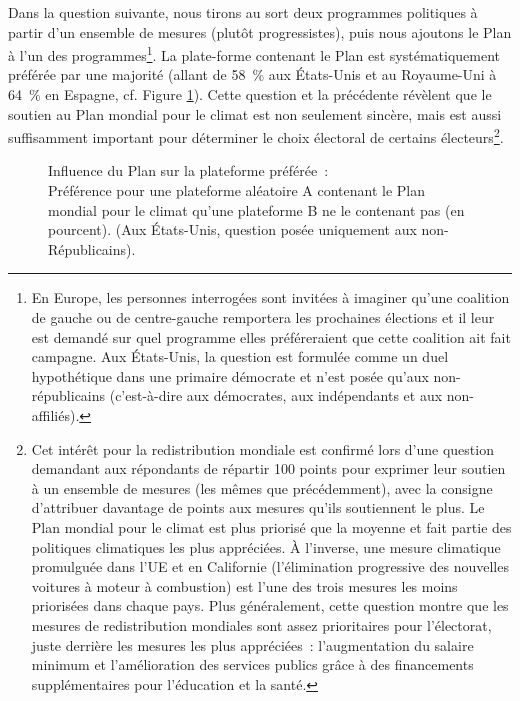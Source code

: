 \documentclass[a5paper,french]{memoir}
\begin{document}
Dans la question suivante, nous tirons au sort deux programmes politiques à partir d'un ensemble de mesures (plutôt progressistes), puis nous ajoutons le Plan à l'un des programmes\footnote{En Europe, les personnes interrogées sont invitées à imaginer qu'une coalition de gauche ou de centre-gauche remportera les prochaines élections et il leur est demandé sur quel programme elles préféreraient que cette coalition ait fait campagne. Aux États-Unis, la question est formulée comme un duel hypothétique dans une primaire démocrate et n'est posée qu'aux non-républicains (c'est-à-dire aux démocrates, aux indépendants et aux non-affiliés).}. La plate-forme contenant le Plan est systématiquement préférée par une majorité (allant de 58~\% aux États-Unis et au Royaume-Uni à 64~\% en Espagne, cf. Figure \ref{fig:conjoint_left_ag_b}). Cette question et la précédente révèlent que le soutien au Plan mondial pour le climat est non seulement sincère, mais est aussi suffisamment important pour déterminer le choix électoral de certains électeurs\footnote{
Cet intérêt pour 
la redistribution mondiale est confirmé lors d'une question demandant aux répondants de répartir 100 points pour exprimer leur soutien à un ensemble de mesures (les mêmes que précédemment), avec la consigne d'attribuer davantage de points aux mesures qu'ils soutiennent le plus. Le Plan mondial pour le climat est plus priorisé que la moyenne et fait partie des politiques climatiques les plus appréciées. À l'inverse, une mesure climatique promulguée dans l'UE et en Californie (l'élimination progressive des nouvelles voitures à moteur à combustion) est l'une des trois mesures les moins priorisées dans chaque pays. Plus généralement, cette question montre que les mesures de redistribution mondiales sont assez prioritaires pour l'électorat, juste derrière les mesures les plus appréciées~: l'augmentation du salaire minimum et l'amélioration des services publics grâce à des financements supplémentaires pour l'éducation et la santé.}. 

\begin{figure}[h!] 
  \caption[Influence du Plan sur la plateforme préférée]{Influence du Plan sur la plateforme préférée~:\\ Préférence pour une plateforme aléatoire A contenant le Plan mondial pour le climat qu'une plateforme B ne le contenant pas (en pourcent). (Aux États-Unis, question posée uniquement aux non-Républicains).}\label{fig:conjoint_left_ag_b}
\end{figure}
\end{document}
